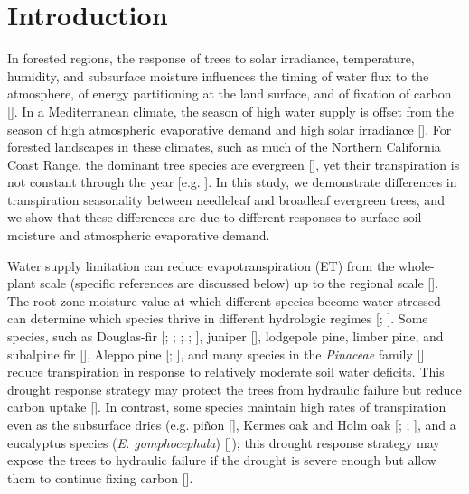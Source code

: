 \section{Introduction}
In forested regions, the response of trees to solar irradiance, temperature, humidity, and subsurface moisture influences the timing of water flux to the atmosphere, of energy partitioning at the land surface, and of fixation of carbon [\cite{bonan}]. In a Mediterranean climate, the season of high water supply is offset from the season of high atmospheric evaporative demand and high solar irradiance [\cite{baldocchi2007limits}]. For forested landscapes in these climates, such as much of the Northern California Coast Range, the dominant tree species are evergreen [\cite{woudenberg2010forest}], yet their transpiration is not constant through the year [e.g. \cite{vinukollu2010global}].  In this study, we demonstrate differences in transpiration seasonality between needleleaf and broadleaf evergreen trees, and we show that these differences are due to different responses to surface soil moisture and atmospheric evaporative demand.

Water supply limitation can reduce evapotranspiration (ET) from the whole-plant scale (specific references are discussed below) up to the regional scale [\cite{jung2010recent}].  The root-zone moisture value at which different species become water-stressed can determine which species thrive in different hydrologic regimes [\cite{rodriguez2001intensive}; \cite{kumagai2012strategies}].  Some species, such as Douglas-fir [\cite{granier1987evaluation}; \cite{tan1976factors}; \cite{black1979evapotranspiration}; \cite{humphreys2003annual}; \cite{jassal2009evapotranspiration}], juniper [\cite{mcdowell2008mechanisms}], lodgepole pine, limber pine, and subalpine fir [\cite{pataki2000sap}], Aleppo pine [\cite{baquedano2006comparative}; \cite{chirino2011daily}], and many species in the \textit{Pinaceae} family [\cite{martinez2004hydraulic}] reduce transpiration in response to relatively moderate soil water deficits.  This drought response strategy may protect the trees from hydraulic failure but reduce carbon uptake [\cite{mcdowell2008mechanisms}].  In contrast, some species maintain high rates of transpiration even as the subsurface dries (e.g. pi\~non [\cite{mcdowell2008mechanisms}], Kermes oak and Holm oak [\cite{baquedano2006comparative}; \cite{chirino2011daily}; \cite{david2007water}], and a eucalyptus species (\textit{E. gomphocephala}) [\cite{franks2007anisohydric}]); this drought response strategy may expose the trees to hydraulic failure if the drought is severe enough but allow them to continue fixing carbon [\cite{mcdowell2008mechanisms}]. 

